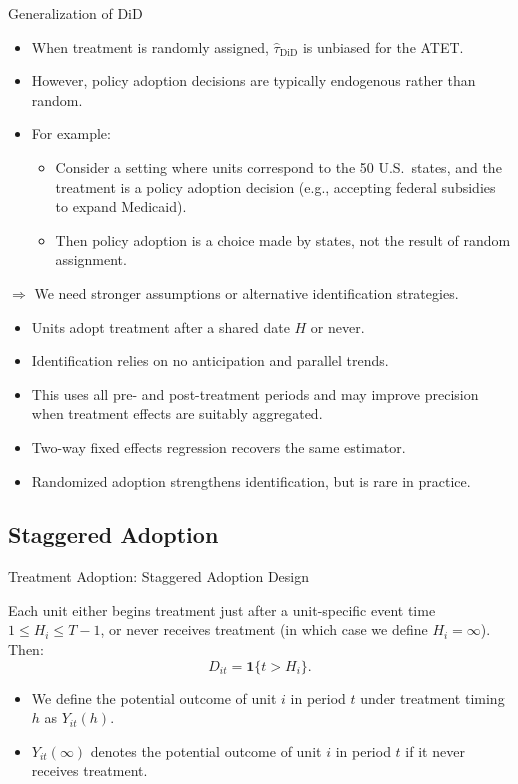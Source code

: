 \documentclass[11pt,aspectratio=169]{beamer}
\newcommand{\ind}{\mathbf{1}}
\begin{document}
\begin{frame}{Generalization of DiD}
\begin{itemize}
  \item When treatment is randomly assigned, $\widehat\tau_{\text{DiD}}$ is unbiased for the ATET.
  \item However, policy adoption decisions are typically endogenous rather than random.
  \item For example:
  \begin{itemize}
    \item Consider a setting where units correspond to the 50 U.S.\ states, and the treatment is a policy adoption decision (e.g., accepting federal subsidies to expand Medicaid).
    \item Then policy adoption is a choice made by states, not the result of random assignment.
  \end{itemize}
\end{itemize}
$\Rightarrow$ We need stronger assumptions or alternative identification strategies.
\end{frame}

\begin{summaryframe}
\begin{itemize}
  \item Units adopt treatment after a shared date $H$ or never.
  \item Identification relies on no anticipation and parallel trends.
  \item This uses all pre- and post-treatment periods and may improve precision when treatment effects are suitably aggregated.
  \item Two-way fixed effects regression recovers the same estimator.
  \item Randomized adoption strengthens identification, but is rare in practice.
\end{itemize}
\end{summaryframe}


\subsection{Staggered Adoption}

\begin{frame}{Treatment Adoption: Staggered Adoption Design}
\begin{definitionbox}
Each unit either begins treatment just after a unit-specific event time $1\le H_i\le T-1$, or never receives treatment (in which case we define $H_i=\infty$). Then:
\[D_{it}=\ind\{t>H_i\}.\]
\end{definitionbox}
\begin{itemize}
  \item We define the potential outcome of unit $i$ in period $t$ under treatment timing $h$ as $Y_{it}(h)$.
  \item $Y_{it}(\infty)$ denotes the potential outcome of unit $i$ in period $t$ if it never receives treatment.
\end{itemize}
\end{frame}
\end{document}
